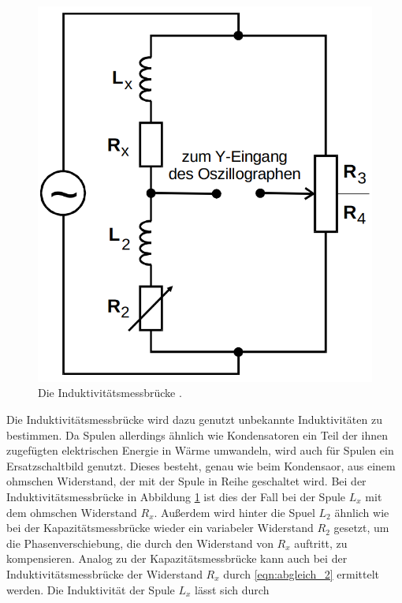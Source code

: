 \begin{figure}
    \centering
    \includegraphics[scale=0.25]{content/Induktivitaetsmessbruecke.png}
    \caption{Die Induktivitätsmessbrücke \cite[S. 221]{anleitung}.}
    \label{fig:induk}
\end{figure}

Die Induktivitätsmessbrücke wird dazu genutzt unbekannte Induktivitäten zu bestimmen.
Da Spulen allerdings ähnlich wie Kondensatoren ein Teil der ihnen zugefügten elektrischen Energie in Wärme umwandeln,
wird auch für Spulen ein Ersatzschaltbild genutzt. Dieses besteht, genau wie beim Kondensaor,
aus einem ohmschen Widerstand, der mit der Spule in Reihe geschaltet wird.
Bei der Induktivitätsmessbrücke in Abbildung \ref{fig:induk} ist dies der Fall bei der Spule $L_x$ mit dem ohmschen Widerstand $R_x$.
Außerdem wird hinter die Spuel $L_2$ ähnlich wie bei der Kapazitätsmessbrücke wieder ein variabeler Widerstand $R_2$ gesetzt, 
um die Phasenverschiebung, die durch den Widerstand von $R_x$ auftritt, zu kompensieren.
Analog zu der Kapazitätsmessbrücke kann auch bei der Induktivitätsmessbrücke der Widerstand $R_x$ durch \eqref{eqn:abgleich_2} ermittelt werden.
Die Induktivität der Spule $L_x$ lässt sich durch

